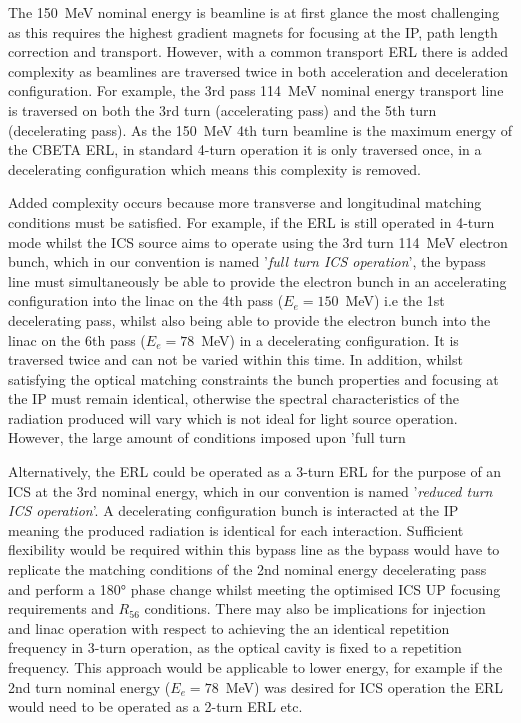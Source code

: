 \documentclass[../main.tex]{subfiles}
\begin{document}
The 150~\si{\mega\electronvolt} nominal energy is beamline is at first glance the most challenging as this requires the highest gradient magnets for focusing at the IP, path length correction and transport. However, with a common transport ERL there is added complexity as beamlines are traversed twice in both acceleration and deceleration configuration. For example, the 3rd pass 114~\si{\mega\electronvolt} nominal energy transport line is traversed on both the 3rd turn (accelerating pass) and the 5th turn (decelerating pass). As the 150~\si{\mega\electronvolt} 4th turn beamline is the maximum energy of the CBETA ERL, in standard 4-turn operation it is only traversed once, in a decelerating configuration which means this complexity is removed.

Added complexity occurs because more transverse and longitudinal matching conditions must be satisfied. For example, if the ERL is still operated in 4-turn mode whilst the ICS source aims to operate using the 3rd turn 114~\si{\mega\electronvolt} electron bunch, which in our convention is named '\textit{full turn ICS operation}', the bypass line must simultaneously be able to provide the electron bunch in an accelerating configuration into the linac on the 4th pass ($E_{e} = 150$~\si{\mega\electronvolt}) i.e the 1st decelerating pass, whilst also being able to provide the electron bunch into the linac on the 6th pass ($E_{e} = 78$~\si{\mega\electronvolt}) in a decelerating configuration. It is traversed twice and can not be varied within this time. In addition, whilst satisfying the optical matching constraints the bunch properties and focusing at the IP must remain identical, otherwise the spectral characteristics of the radiation produced will vary which is not ideal for light source operation. However, the large amount of conditions imposed upon 'full turn  

Alternatively, the ERL could be operated as a 3-turn ERL for the purpose of an ICS at the 3rd nominal energy, which in our convention is named '\textit{reduced turn ICS operation}'. A decelerating configuration bunch is interacted at the IP meaning the produced radiation is identical for each interaction. Sufficient flexibility would be required within this bypass line as the bypass would have to replicate the matching conditions of the 2nd nominal energy decelerating pass and perform a 180\si{\degree} phase change whilst meeting the optimised ICS UP focusing requirements and $R_{56}$ conditions. There may also be implications for injection and linac operation with respect to achieving the an identical repetition frequency in 3-turn operation, as the optical cavity is fixed to a repetition frequency. This approach would be applicable to lower energy, for example if the 2nd turn nominal energy ($E_{e} = 78$~\si{\mega\electronvolt}) was desired for ICS operation the ERL would need to be operated as a 2-turn ERL etc. 
\end{document}
